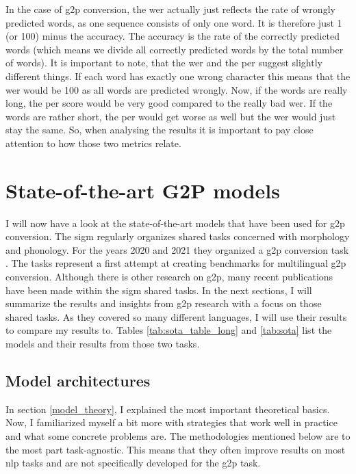 In the case of \ac{g2p} conversion, the \ac{wer} actually just reflects the rate of wrongly predicted words, as one sequence consists of only one word. It is therefore just 1 (or 100) minus the accuracy. The accuracy is the rate of the correctly predicted words (which means we divide all correctly predicted words by the total number of words). It is important to note, that the \ac{wer} and the \ac{per} suggest slightly different things. If each word has exactly one wrong character this means that the \ac{wer} would be 100 as all words are predicted wrongly. Now, if the words are really long, the \ac{per} score would be very good compared to the really bad \ac{wer}. If the words are rather short, the \ac{per} would get worse as well but the \ac{wer} would just stay the same. So, when analysing the results it is important to pay close attention to how those two metrics relate.


\section{State-of-the-art G2P models}
\label{section:sig}
I will now have a look at the state-of-the-art models that have been used for \ac{g2p} conversion. The \ac{sigm} \citep{Sigmorphon.2021} regularly organizes shared tasks concerned with morphology and phonology. For the years 2020 and 2021 they organized a \ac{g2p} conversion task \citep{Ashby-Bartley.2021, gorman-etal-2020-sigmorphon}. The tasks represent a first attempt at creating benchmarks for multilingual \ac{g2p} conversion. Although there is other research on \ac{g2p}, many recent publications have been made within the \ac{sigm} shared tasks. In the next sections, I will summarize the results and insights from \ac{g2p} research with a focus on those shared tasks. As they covered so many different languages, I will use their results to compare my results to. Tables \ref{tab:sota_table_long} and \ref{tab:sota} list the models and their results from those two tasks.

\subsection{Model architectures}
In section \ref{model_theory}, I explained the most important theoretical basics. Now, I familiarized myself a bit more with strategies that work well in practice and what some concrete problems are. The methodologies mentioned below are to the most part task-agnostic. This means that they often improve results on most \ac{nlp} tasks and are not specifically developed for the \ac{g2p} task.

